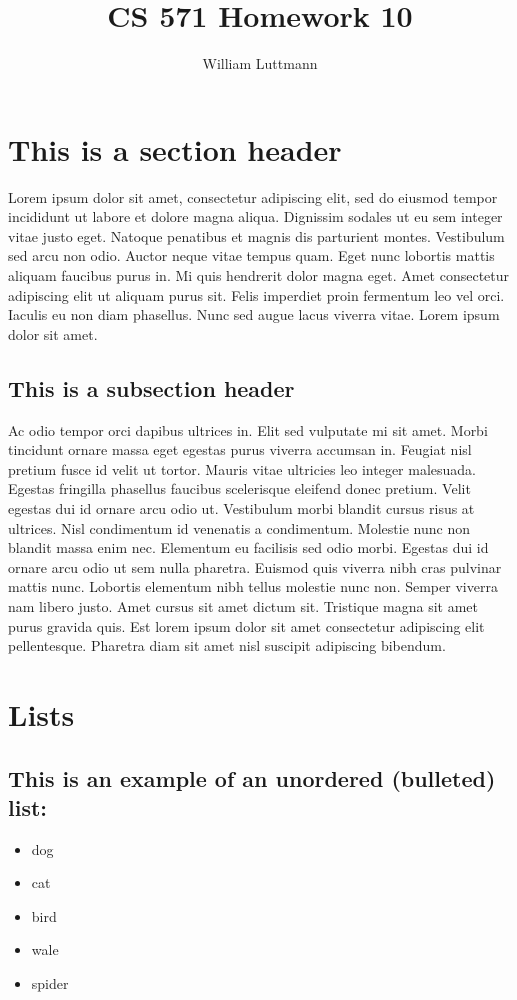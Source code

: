 \documentclass{article}
\begin{document}
	\title{CS 571 Homework 10}
	\author{William Luttmann}
	\maketitle

\newpage

\section{This is a section header}
Lorem ipsum dolor sit amet, consectetur adipiscing elit, sed do eiusmod tempor incididunt ut labore et dolore magna aliqua. Dignissim sodales ut eu sem integer vitae justo eget. Natoque penatibus et magnis dis parturient montes. Vestibulum sed arcu non odio. Auctor neque vitae tempus quam. Eget nunc lobortis mattis aliquam faucibus purus in. Mi quis hendrerit dolor magna eget. Amet consectetur adipiscing elit ut aliquam purus sit. Felis imperdiet proin fermentum leo vel orci. Iaculis eu non diam phasellus. Nunc sed augue lacus viverra vitae. Lorem ipsum dolor sit amet.
\subsection{This is a subsection header}
Ac odio tempor orci dapibus ultrices in. Elit sed vulputate mi sit amet. Morbi tincidunt ornare massa eget egestas purus viverra accumsan in. Feugiat nisl pretium fusce id velit ut tortor. Mauris vitae ultricies leo integer malesuada. Egestas fringilla phasellus faucibus scelerisque eleifend donec pretium. Velit egestas dui id ornare arcu odio ut. Vestibulum morbi blandit cursus risus at ultrices. Nisl condimentum id venenatis a condimentum. Molestie nunc non blandit massa enim nec. Elementum eu facilisis sed odio morbi. Egestas dui id ornare arcu odio ut sem nulla pharetra. Euismod quis viverra nibh cras pulvinar mattis nunc. Lobortis elementum nibh tellus molestie nunc non. Semper viverra nam libero justo. Amet cursus sit amet dictum sit. Tristique magna sit amet purus gravida quis. Est lorem ipsum dolor sit amet consectetur adipiscing elit pellentesque. Pharetra diam sit amet nisl suscipit adipiscing bibendum.

\newpage
	\section{Lists}
	\subsection{This is an example of an unordered (bulleted) list:}
		\begin{itemize}
			\item dog
			\item cat
			\item bird
			\item wale
			\item spider
		\end{itemize}
\end{document}
